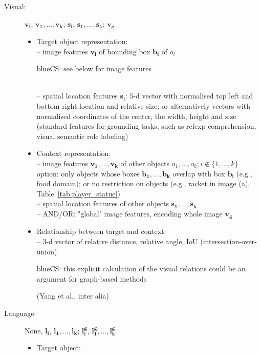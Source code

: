 \documentclass[11pt,a4paper]{article}
\renewcommand{\vec}[1]{\mathbf{#1}\xspace}
\newcommand{\cs}[1]{\begin{color}{blue}CS: #1\end{color}\xspace}
\begin{document}
\begin{description}
	\item[Visual:] $\mathbf{v_i}$, $\mathbf{v_1}, \dots, \mathbf{v_k}$; $\mathbf{s_i}$, $\mathbf{s_1}, \dots, \mathbf{s_k}$; $\mathbf{v_g}$
	\begin{itemize}
		\item Target object representation:\\
		-- image features $\mathbf{v_i}$ of bounding box $\mathbf{b_i}$ of $o_i$ \cs{see below for image features}\\
		-- spatial location features $\mathbf{s_i}$: 5-d vector with normalised top left and bottom right location and relative size; or alternatively  vectors with normalised coordinates of the center, the width, height and size (standard features for grounding tasks, such as refexp comprehension, visual semantic role labeling)
		\item Context representation:\\
		-- image features $\mathbf{v_1}, \dots, \mathbf{v_k}$ of other objects $o_1, \dots, o_k; i \notin \{1, \dots, k\}$\\
		option: only objects whose boxes $\mathbf{b_1}, \dots, \mathbf{b_k}$ overlap with box $\mathbf{b_i}$ (e.g., food domain); or no restriction on objects (e.g., racket in image (a), Table~\ref{tab:player_statue})\\
		-- spatial location features of other objects $\mathbf{s_1}, \dots, \mathbf{s_k}$\\
		-- AND/OR: "global" image features, encoding whole image $\mathbf{v_g}$
		\item Relationship between target and context:\\
		-- 3-d vector of relative distance, relative angle, IoU (intersection-over-union) \cs{this explicit calculation of the visual relations could be an argument for graph-based methods}
		(Yang et al., inter alia)\\
	\end{itemize}
	\item[Language:] None, $\vec{l_i}$, $\vec{l_1}, \dots, \vec{l_k}$; $\vec{l^g_i}$,  $\vec{l^g_1}, \dots, \vec{l^g_k}$
	\begin{itemize}
		\item Target object:\\

\end{itemize}
\end{description}
\end{document}
